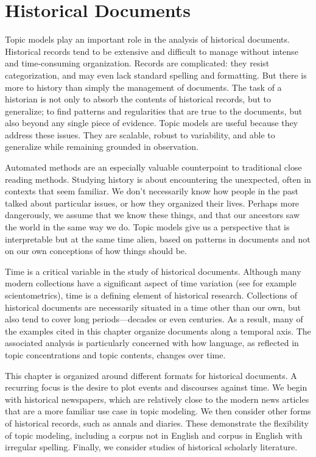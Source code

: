 
\chapter{Historical Documents}
\label{ch:nonfiction}

Topic models play an important role in the analysis of historical documents.
Historical records tend to be extensive and difficult to manage without intense and time-consuming organization.
Records are complicated: they resist categorization, and may even lack standard spelling and formatting.
But there is more to history than simply the management of documents.
The task of a historian is not only to absorb the contents of historical records, but to generalize; to find patterns and regularities that are true to the documents, but also beyond any single piece of evidence.
Topic models are useful because they address these issues. They are scalable, robust to variability, and able to generalize while remaining grounded in observation.

Automated methods are an especially valuable counterpoint to traditional close reading methods.
Studying history is about encountering the unexpected, often in contexts that seem familiar.
We don't necessarily know how people in the past talked about particular issues, or how they organized their lives.
Perhaps more dangerously, we assume that we know these things, and that our ancestors saw the world in the same way we do.
Topic models give us a perspective that is interpretable but at the same time alien, based on patterns in documents and not on our own conceptions of how things should be.

Time is a critical variable in the study of historical documents.
Although many modern collections have a significant aspect of time variation (see for example scientometrics), time is a defining element of historical research.
Collections of historical documents are necessarily situated in a time other than our own, but also tend to cover long periods---decades or even centuries.
As a result, many of the examples cited in this chapter organize documents along a temporal axis.
The associated analysis is particularly concerned with how language, as reflected in topic concentrations and topic contents, changes over time.

This chapter is organized around different formats for historical documents.
A recurring focus is the desire to plot events and discourses against time.
We begin with historical newspapers, which are relatively close to the modern news articles that are a more familiar use case in topic modeling.
We then consider other forms of historical records, such as annals and diaries.
These demonstrate the flexibility of topic modeling, including a corpus not in English and corpus in English with irregular spelling.
Finally, we consider studies of historical scholarly literature.

